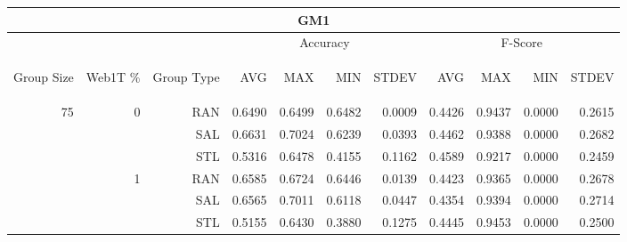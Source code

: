 \begin{center}
\begin{table}[htbp] 
 \begin{center}
\begin{tabular}{ | r | r | r | r | r | r | r | r | r | r | r |}
\hline
\multicolumn{11}{|c|}{GM1}\\
\hline
 & & & \multicolumn{4}{|c|}{Accuracy} & \multicolumn{4}{|c|}{F-Score}\\ \cline{4-11}
\begin{sideways}Group Size\end{sideways} & \begin{sideways}Web1T \%\end{sideways} & \begin{sideways}Group Type\end{sideways} & \begin{sideways}AVG\end{sideways} & \begin{sideways}MAX\end{sideways} & \begin{sideways}MIN\end{sideways} & \begin{sideways}STDEV\end{sideways} & \begin{sideways}AVG\end{sideways} & \begin{sideways}MAX\end{sideways} & \begin{sideways}MIN\end{sideways} & \begin{sideways}STDEV\end{sideways}\\
\hline
\multirow{18}{*}{75}
 & \multirow{3}{*}{0} & RAN & 0.6490 & 0.6499 & 0.6482 & 0.0009 & 0.4426 & 0.9437 & 0.0000 & 0.2615\\ \cline{3-11}
 &   & SAL & 0.6631 & 0.7024 & 0.6239 & 0.0393 & 0.4462 & 0.9388 & 0.0000 & 0.2682\\ \cline{3-11}
 &   & STL & 0.5316 & 0.6478 & 0.4155 & 0.1162 & 0.4589 & 0.9217 & 0.0000 & 0.2459\\ \cline{2-11}
 & \multirow{3}{*}{1} & RAN & 0.6585 & 0.6724 & 0.6446 & 0.0139 & 0.4423 & 0.9365 & 0.0000 & 0.2678\\ \cline{3-11}
 &   & SAL & 0.6565 & 0.7011 & 0.6118 & 0.0447 & 0.4354 & 0.9394 & 0.0000 & 0.2714\\ \cline{3-11}
 &   & STL & 0.5155 & 0.6430 & 0.3880 & 0.1275 & 0.4445 & 0.9453 & 0.0000 & 0.2500\\ \cline{2-11}

\end{tabular}
\end{center}
\end{table}
\end{center}
